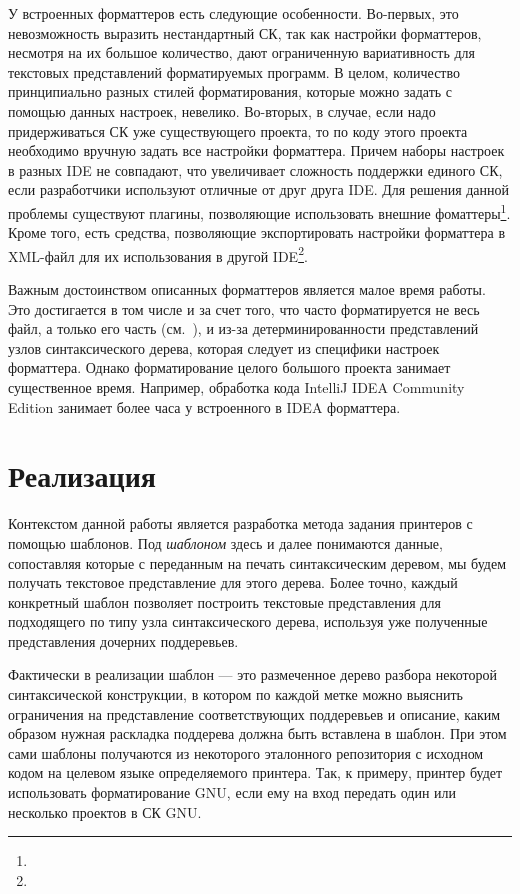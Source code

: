 У встроенных форматтеров есть следующие особенности.
Во-первых, это невозможность выразить
нестандартный СК, так как настройки форматтеров, несмотря на их большое
количество,
дают ограниченную вариативность для текстовых представлений форматируемых
программ. В целом, количество принципиально разных
стилей форматирования, которые можно задать с помощью данных настроек,
невелико.
Во-вторых, в случае, если надо
придерживаться СК уже существующего проекта, то по коду этого проекта необходимо
вручную задать все настройки форматтера.
Причем наборы настроек в разных IDE не совпадают, что увеличивает сложность
поддержки единого СК, если разработчики используют отличные от друг друга IDE.
Для решения данной проблемы существуют плагины, позволяющие использовать
внешние фоматтеры\footnote{}.
Кроме того, есть средства, позволяющие экспортировать настройки форматтера в
XML-файл для их использования в другой
IDE\footnote{}.

Важным достоинством описанных форматтеров является малое время работы.
Это достигается в том числе и за счет того, что часто форматируется не весь
файл, а только его часть (см.~\cite{eclipse}),
и из-за детерминированности представлений узлов синтаксического дерева,
которая следует из специфики настроек форматтера.
Однако форматирование целого большого проекта занимает существенное время.
Например, обработка кода IntelliJ IDEA Community Edition занимает более часа
у встроенного в IDEA форматтера.

\section{Реализация}

Контекстом данной работы является разработка метода задания принтеров с помощью шаблонов.
Под \emph{шаблоном} здесь и далее понимаются данные, сопоставляя которые с
переданным на печать синтаксическим деревом, мы будем получать текстовое представление
для этого дерева. Более точно, каждый конкретный шаблон позволяет построить
текстовые представления для подходящего по типу 
узла синтаксического дерева, используя уже полученные представления дочерних поддеревьев.

Фактически в реализации шаблон --- это размеченное дерево разбора
некоторой синтаксической конструкции, в котором по каждой метке можно выяснить
ограничения на представление соответствующих поддеревьев и описание, каким
образом нужная раскладка поддерева должна быть вставлена в шаблон.
При этом сами шаблоны получаются из некоторого эталонного репозитория с исходном
кодом на целевом языке определяемого принтера.
Так, к примеру, принтер будет использовать форматирование GNU, если ему на вход
передать один или несколько проектов в СК GNU.

